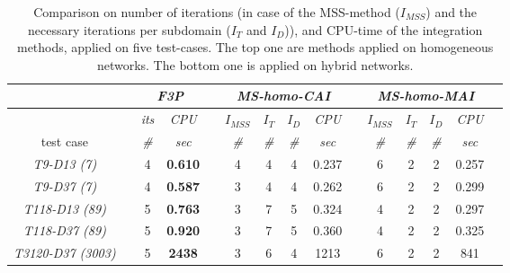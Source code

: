 \begin{table}[!ht]
\renewcommand{\arraystretch}{1.3}
\centering
\caption{Comparison on number of iterations (in case of the MSS-method ($I_{MSS}$) and the necessary iterations per subdomain ($I_T$ and $I_D$)), and CPU-time of the integration methods, applied on five test-cases. The top one are methods applied on homogeneous networks. The bottom one is applied on hybrid networks. }\label{tab:speed}
\begin{adjustbox}{width=1\textwidth} %
\small
\begin{tabular}{@{}l c cc c  cccc c cccc c  @{}}\toprule
                               && \multicolumn{2}{c}{\textit{F3P}} &&     \multicolumn{4}{c}{\textit{MS-homo-CAI}} && \multicolumn{4}{c}{\textit{MS-homo-MAI}} \\ \midrule 
\multicolumn{1}{l}{}        && \textit{its}      & \textit{CPU} && $I_{MSS}$      & $I_T$   &  $I_D$      & \textit{CPU}     &&$I_{MSS}$      & $I_T$   &  $I_D$      & \textit{CPU}      \\
\cmidrule{3-4}  \cmidrule{6-9}  \cmidrule{11-14}   
\multicolumn{1}{c}{test case}      && \textit{\#}       & \textit{sec} && \textit{\#}      & \textit{\#}    & \textit{\#}       & \textit{sec}     && \textit{\#}        & \textit{\#}     &  \textit{\#}       & \textit{sec}  \\
\midrule
\multicolumn{1}{c}{\textit{T9-D13 (7)}}      && 4 &\textbf{ 0.610}  && 4 & 4 & 4 &  0.237 && 6       & 2 & 2  & {0.257}\\
\multicolumn{1}{c}{\textit{T9-D37 (7)}}      && 4 & \textbf{0.587}    && 3 & 4 & 4 &  0.262 && 6       & 2 & 2  & {0.299}\\
\multicolumn{1}{c}{{\textit{T118-D13 (89)}}}   && 5 & \textbf{0.763}     && 3       & 7 & 5  & 0.324 && 4  & 2 &2 &  0.297  \\
\multicolumn{1}{c}{{\textit{T118-D37 (89)}}}   && 5 & \textbf{0.920}    && 3       & 7 & 5  & 0.360 && 4 & 2 & 2 &  0.325 \\
\multicolumn{1}{c}{{\textit{T3120-D37 (3003)}}}   && 5 & \textbf{2438}   &&  3 & 6  & 4  & 1213  && 6 & 2 & 2 &  841    \\

\end{tabular}
\end{adjustbox}
\end{table}
